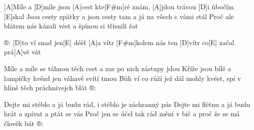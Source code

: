 
[A]Míle a [D]míle jsou [A]cest kte[F#m]ré znám, 
[A]jdou trávou [D]i úbočím [E]skal
Jsou cesty zpátky a jsou cesty tam 
a já na všech s vámi stál
Proč ale blátem nás kázali vést 
a špínou si třísnili šat

®: [D]to ví snad jen[E] déšť [A]a vítr [F#m]kolem nás
ten [D]vítr co[E] začal prá[A]vě vát

Míle a míle se táhnou těch cest 
a zas po nich zástupy jdou
Kříže jsou bílé a lampičky hvězd 
jen váhavě svítí tmou
Bůh ví co růží jež dál mohly kvést, 
spí v hlíně těch práchnivejch blát
®: 

Dejte mi stéblo a já budu rád, 
i stéblo je záchranný pás
Dejte mi flétnu a já budu hrát 
a zpívat a ptát se vás
Proč jen se účel tak rád mění v bič 
a proč že se má člověk bát
®: 
